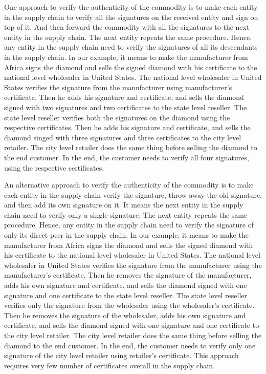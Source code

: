 	One approach to verify the authenticity of the commodity is to make each entity in the supply chain to verify all the signatures on the received entity and sign on top of it.
	And then forward the commodity with all the signatures to the next entity in the supply chain.
	The next entity repeats the same procedure.
	Hence, any entity in the supply chain need to verify the signatures of all its descendants in the supply chain.
	In our example, it means to make the manufacturer from Africa signs the diamond and sells the signed diamond with his certificate to the national level wholesaler in United States.
	The national level wholesaler in United States verifies the signature from the manufacturer using manufacturer's certificate.
	Then he adds his signature and certificate, and sells the diamond signed with two signatures and two certificates to the state level reseller.
	The state level reseller verifies both the signatures on the diamond using the respective certificates.
	Then he adds his signature and certificate, and sells the diamond singed with three signatures and three certificates to the city level retailer. 
	The city level retailer does the same thing before selling the diamond to the end customer.
	In the end, the customer needs to verify all four signatures, using the respective certificates.


	An alternative approach to verify the authenticity of the commodity is to make each entity in the supply chain verify the signature, throw away the old signature, and then add its own signature on it. 
	It means the next entity in the supply chain need to verify only a single signature.
	The next entity repeats the same procedure.
	Hence, any entity in the supply chain need to verify the signature of only its direct peer in the supply chain. 
	In our example, it means to make the manufacturer from Africa signs the diamond and sells the signed diamond with his certificate to the national level wholesaler in United States.
	The national level wholesaler in United States verifies the signature from the manufacturer using the manufacturer's certificate.
	Then he removes the signature of the manufacturer, adds his own signature and certificate, and sells the diamond signed with one signature and one certificate to the state level reseller.
	The state level reseller verifies only the signature from the wholesaler using the wholesaler's certificate.
	Then he removes the signature of the wholesaler, adds his own signature and certificate, and sells the diamond signed with one signature and one certificate to the city level retailer.
	The city level retailer does the same thing before selling the diamond to the end customer.
	In the end, the customer needs to verify only one signature of the city level retailer using retailer's certificate.
	This approach requires very few number of certificates overall in the supply chain.

